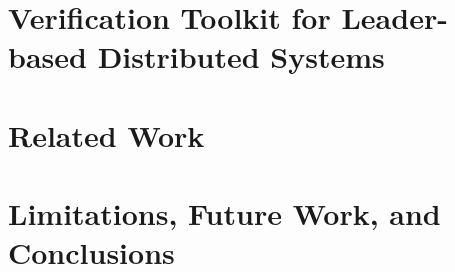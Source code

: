 \documentclass[letterpaper,11pt]{yalephd}
\begin{document}
\chapter{Verification Toolkit for Leader-based Distributed Systems }
\label{chapter:witness-passing}











\chapter{Related Work} 
\label{chapter:related}


\chapter{Limitations, Future Work, and Conclusions}
\label{chapter:conclusion}


\backmatter


\end{document}
